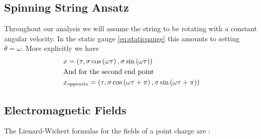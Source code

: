 \documentclass[11pt,a4paper]{article}
\begin{document}
\FloatBarrier
\subsection{Spinning String Ansatz}
Throughout our analysis we will assume the string to be rotating with a constant angular velocity. In the static gauge \ref{eq:staticqauge} this amounts to setting $\dot{\theta}=\omega$. More explicitly we have
\begin{subequations}
\label{eq:SpinningStringAnsatz}
\begin{align}
&x=\left(\tau,\sigma\cos\left(\omega\tau\right),\sigma\sin\left(\omega\tau\right)\right) \\
&\text{And for the second end point}\notag\\
&x_{opposite}=\left(\tau,\sigma\cos\left(\omega\tau+\pi\right),\sigma\sin\left(\omega\tau+\pi\right)\right)
\end{align}
\end{subequations}

\FloatBarrier
\subsection{Electromagnetic Fields}

The Lienard-Wichert formulas for the fields of a point charge are \cite{Jackson}:
\end{document}
